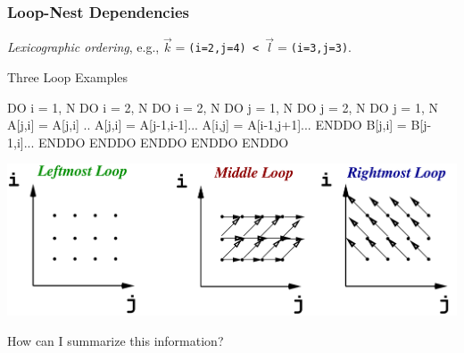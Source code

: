 \documentclass{beamer}
\begin{document}
\begin{frame}[fragile,t]
  \frametitle{Loop-Nest Dependencies} %

{\em Lexicographic ordering}, 
e.g., {\tt$\vec{k}=$(i=2,j=4) < $\vec{l}=$(i=3,j=3)}.

\begin{block}{Three Loop Examples}
\begin{colorcode}
DO i = 1, N             DO i = 2, N                 DO i = 2, N
  DO j = 1, N             DO j = 2, N                 DO j = 1, N 
    A[j,i] = A[j,i] ..      A[j,i] = A[j-1,i-1]...        A[i,j] = A[i-1,j+1]...
  ENDDO                     B[j,i] = B[j-1,i]...      ENDDO
ENDDO                   ENDDO ENDDO                 ENDDO
\end{colorcode}
\end{block} 
\pause

\hspace{-3ex}\includegraphics[height=23ex]{Figures/L5-LoopPar/LoopDeps}  

\alert{How can I summarize this information?} %

\end{frame}
\end{document}
